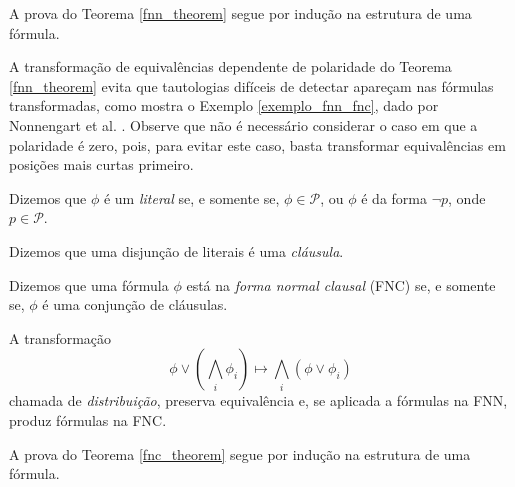 A prova do Teorema \ref{fnn_theorem} segue por indução na estrutura de uma fórmula.

A transformação de equivalências dependente de polaridade do Teorema \ref{fnn_theorem} evita que tautologias difíceis de detectar apareçam nas fórmulas transformadas, como mostra o Exemplo \ref{exemplo_fnn_fnc}, dado por Nonnengart et al. \cite{nonnengart2001computing}. Observe que não é necessário considerar o caso em que a polaridade é zero, pois, para evitar este caso, basta transformar equivalências em posições mais curtas primeiro.

\begin{definition}
	Dizemos que $\phi$ é um \emph{literal} se, e somente se, $\phi \in \mathcal{P}$, ou $\phi$ é da forma $\neg p$, onde $p \in \mathcal{P}$.
	
	Dizemos que uma disjunção de literais é uma \emph{cláusula}.
	
    Dizemos que uma fórmula $\phi$ está na \emph{forma normal clausal} (FNC) se, e somente se, $\phi$ é uma conjunção de cláusulas.
\end{definition}

\begin{theorem}
	\label{fnc_theorem}
    A transformação $$\phi \vee \left( \bigwedge_i \phi_i \right) \longmapsto \bigwedge_i \left( \phi \vee \phi_i \right)$$ chamada de \emph{distribuição}, preserva equivalência e, se aplicada a fórmulas na FNN, produz fórmulas na FNC.
\end{theorem}

A prova do Teorema \ref{fnc_theorem} segue por indução na estrutura de uma fórmula.

